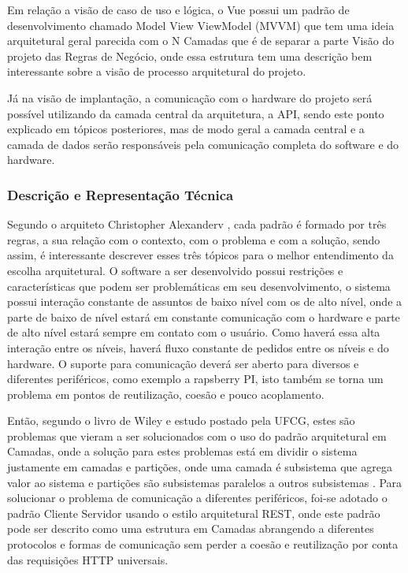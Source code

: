 \begin{apendicesenv}
Em relação a visão de caso de uso e lógica, o Vue possui um padrão de desenvolvimento chamado Model View ViewModel (MVVM) que tem uma ideia arquitetural geral parecida com o N Camadas que é de separar a parte Visão do projeto das Regras de Negócio, onde essa estrutura tem uma descrição bem interessante sobre a visão de processo arquitetural do projeto.

Já na visão de implantação, a comunicação com o hardware do projeto será possível utilizando da camada central da arquitetura, a API, sendo este ponto explicado em tópicos posteriores, mas de modo geral a camada central e a camada de dados serão responsáveis pela comunicação completa do software e do hardware.

\subsubsection{Descrição e Representação Técnica}
Segundo o arquiteto Christopher Alexanderv \cite{livroPadroesArq}, cada padrão é formado por três regras, a sua relação com o contexto, com o problema e com a solução, sendo assim, é interessante descrever esses três tópicos para o melhor entendimento da escolha arquitetural. O software a ser desenvolvido possui restrições e características que podem ser problemáticas em seu desenvolvimento, o sistema possui interação constante de assuntos de baixo nível com os de alto nível, onde a parte de baixo de nível estará em constante comunicação com o hardware e parte de alto nível estará sempre em contato com o usuário. Como haverá essa alta interação entre os níveis, haverá fluxo constante de pedidos entre os níveis e do hardware. O suporte para comunicação deverá ser aberto para diversos e diferentes periféricos, como exemplo a rapsberry PI, isto também se torna um problema em pontos de reutilização, coesão e pouco acoplamento.

Então, segundo o livro de Wiley\cite{livroPadroesArq} e estudo postado pela UFCG\cite{nCamadas}, estes são problemas que vieram a ser solucionados com o uso do padrão arquitetural em Camadas, onde a solução para estes problemas está em dividir o sistema justamente em camadas e partições, onde uma camada é subsistema que agrega valor ao sistema e partições são subsistemas paralelos a outros subsistemas \cite{nCamadas}. Para solucionar o problema de comunicação a diferentes periféricos, foi-se adotado o padrão Cliente Servidor usando o estilo arquitetural REST, onde este padrão pode ser descrito como uma estrutura em Camadas abrangendo a diferentes protocolos e formas de comunicação sem perder a coesão e reutilização por conta das requisições HTTP universais.


\end{apendicesenv}
